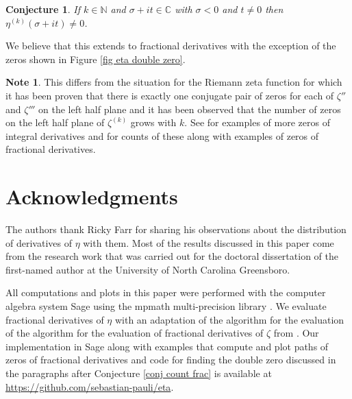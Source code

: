 \documentclass{amsart}
\theoremstyle{plain}
\newtheorem{conjecture}[theorem]{Conjecture}
\theoremstyle{definition}
\newtheorem{note}[theorem]{Note}
\newcommand{\zetak}{\zeta^{(k)}}
\newcommand{\R}{\mathbb{R}} \newcommand{\Z}{\mathbb{Z}}
\newcommand{\C}{\mathbb{C}} \newcommand{\N}{\mathbb{N}}
\begin{document}
\begin{conjecture}
If $k\in\N$ and $\sigma+it\in\C$ with $\sigma<0$ and $t\ne0$ then 
\(\eta^{(k)}(\sigma+it)\ne 0\).
\end{conjecture}

We believe that this extends to fractional derivatives with the exception of the zeros shown in 
Figure \ref{fig eta double zero}.

\begin{note}
This differs from the situation for the Riemann zeta function for which 
it has been proven that there is exactly one conjugate pair of zeros for
each of \(\zeta''\) and \(\zeta'''\) \cite{yildirim} on the left half plane
and it has been observed that the number of zeros on the left half plane of \(\zetak\) grows with \(k\). 
See \cite{fp} for examples of more zeros of integral derivatives and \cite{fps-icms} for counts of these along with examples of zeros of fractional derivatives.
\end{note}


\section{Acknowledgments}

The authors thank Ricky Farr for sharing his observations about the distribution of derivatives of \(\eta\) with them.  Most of the results discussed in this paper come from the research work that was carried out for the doctoral dissertation of the first-named author  \cite{c24} at the University of North Carolina Greensboro.  

All computations and plots in this paper were performed with the computer algebra system Sage \cite{sage}
using the mpmath multi-precision library \cite{mpmath}.
We evaluate fractional derivatives of \(\eta\) with 
an adaptation of the algorithm for the evaluation of the algorithm for the evaluation of fractional derivatives of \(\zeta\) from \cite{fps-icms}.
Our implementation in Sage along with examples that compute and plot 
paths of zeros of fractional derivatives and code for finding the double zero discussed in the paragraphs after Conjecture
\ref{conj count frac} is available at \url{https://github.com/sebastian-pauli/eta}.








%
\end{document}
